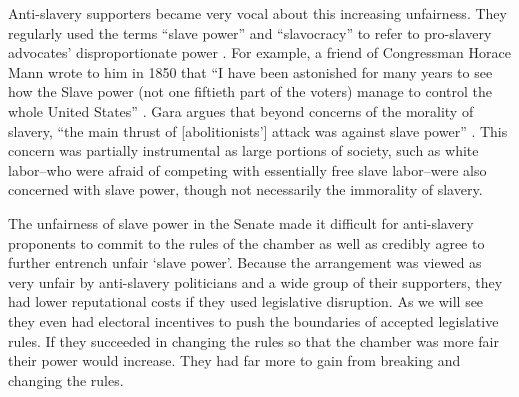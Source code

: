 \documentclass[a4paper]{article}\usepackage[]{graphicx}\usepackage[]{color}
\begin{document}
Anti-slavery supporters became very vocal about this increasing unfairness. They regularly used the terms ``slave power'' and ``slavocracy'' to refer to pro-slavery advocates' disproportionate power \citep{richards2000}. For example, a friend of Congressman Horace Mann wrote to him in 1850 that ``I have been astonished for many years to see how the Slave power (not one fiftieth part of the voters) manage to control the whole United States'' \citep[quoted in][6]{Gara1969}. Gara argues that beyond concerns of the morality of slavery, ``the main thrust of [abolitionists'] attack was against slave power'' \citeyearpar[6]{Gara1969}. This concern was partially instrumental as large portions of society, such as white labor--who were afraid of competing with essentially free slave labor--were also concerned with slave power, though not necessarily the immorality of slavery. 

The unfairness of slave power in the Senate made it difficult for anti-slavery proponents to commit to the rules of the chamber as well as credibly agree to further entrench unfair `slave power'. Because the arrangement was viewed as very unfair by anti-slavery politicians and a wide group of their supporters, they had lower reputational costs if they used legislative disruption. As we will see they even had electoral incentives to push the boundaries of accepted legislative rules. If they succeeded in changing the rules so that the chamber was more fair their power would increase. They had far more to gain from breaking and changing the rules.
\end{document}

